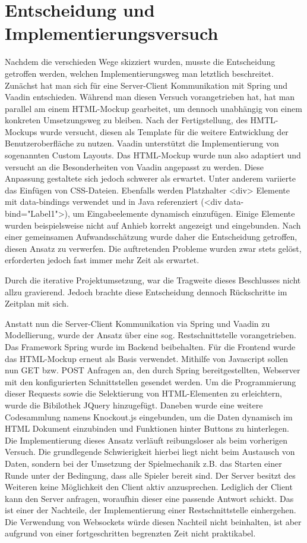 \section{Entscheidung und Implementierungsversuch}
Nachdem die verschieden Wege skizziert wurden, musste die Entscheidung getroffen werden, welchen Implementierungsweg man letztlich beschreitet. Zunächst hat man sich für eine Server-Client Kommunikation mit Spring und Vaadin entschieden. Während man diesen Versuch vorangetrieben hat, hat man parallel am einem HTML-Mockup gearbeitet, um dennoch unabhängig von einem konkreten Umsetzungsweg zu bleiben. Nach der Fertigstellung, des HMTL-Mockups wurde versucht, diesen als Template für die weitere Entwicklung der Benutzeroberfläche zu nutzen. Vaadin unterstützt die Implementierung von sogenannten Custom Layouts. Das HTML-Mockup wurde nun also adaptiert und versucht an die Besonderheiten von Vaadin angepasst zu werden. Diese Anpassung gestaltete sich jedoch schwerer als erwartet. Unter anderem variierte das Einfügen von CSS-Dateien. Ebenfalls werden Platzhalter <div> Elemente mit data-bindings verwendet und in Java referenziert (<div data-bind="Label1">), um Eingabeelemente dynamisch einzufügen. Einige Elemente wurden beispielsweise nicht auf Anhieb korrekt angezeigt und eingebunden. Nach einer gemeinsamen Aufwandsschätzung wurde daher die Entscheidung getroffen, diesen Ansatz zu verwerfen. Die auftretenden Probleme wurden zwar stets gelöst, erforderten jedoch fast immer mehr Zeit als erwartet.

Durch die iterative Projektumsetzung, war die Tragweite dieses Beschlusses nicht allzu gravierend. Jedoch brachte diese Entscheidung dennoch Rückschritte im Zeitplan mit sich. 

Anstatt nun die Server-Client Kommunikation via Spring und Vaadin zu Modellierung, wurde der Ansatz über eine sog. Restschnittstelle vorangetrieben. Das Framework Spring wurde im Backend beibehalten. Für die Frontend wurde das HTML-Mockup erneut als Basis verwendet. Mithilfe von Javascript sollen nun GET bzw. POST Anfragen an, den durch Spring bereitgestellten, Webserver mit den konfigurierten Schnittstellen gesendet werden. Um die Programmierung dieser Requests sowie die Selektierung von HTML-Elementen zu erleichtern, wurde die Bibilothek JQuery hinzugefügt. Daneben wurde eine weitere Codesammlung namens Knockout.js eingebunden, um die Daten dynamisch im HTML Dokument einzubinden und Funktionen hinter Buttons zu hinterlegen. Die Implementierung dieses Ansatz verläuft reibungsloser als beim vorherigen Versuch. Die grundlegende Schwierigkeit hierbei liegt nicht beim Austausch von Daten, sondern bei der Umsetzung der Spielmechanik z.B. das Starten einer Runde unter der Bedingung, dass alle Spieler bereit sind. Der Server besitzt des Weiteren keine Möglichkeit den Client aktiv anzusprechen. Lediglich der Client kann den Server anfragen, woraufhin dieser eine passende Antwort schickt. Das ist einer der Nachteile, der Implementierung einer Restschnittstelle einhergehen. Die Verwendung von Websockets würde diesen Nachteil nicht beinhalten, ist aber aufgrund von einer fortgeschritten  begrenzten Zeit nicht praktikabel. 

